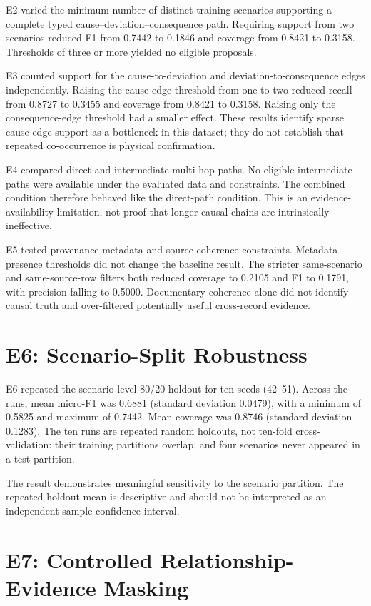 E2 varied the minimum number of distinct training scenarios supporting a
complete typed cause--deviation--consequence path. Requiring support from
two scenarios reduced F1 from 0.7442 to 0.1846 and coverage from 0.8421 to
0.3158. Thresholds of three or more yielded no eligible proposals.

E3 counted support for the cause-to-deviation and deviation-to-consequence
edges independently. Raising the cause-edge threshold from one to two
reduced recall from 0.8727 to 0.3455 and coverage from 0.8421 to 0.3158.
Raising only the consequence-edge threshold had a smaller effect. These
results identify sparse cause-edge support as a bottleneck in this dataset;
they do not establish that repeated co-occurrence is physical confirmation.

E4 compared direct and intermediate multi-hop paths. No eligible
intermediate paths were available under the evaluated data and constraints.
The combined condition therefore behaved like the direct-path condition.
This is an evidence-availability limitation, not proof that longer causal
chains are intrinsically ineffective.

E5 tested provenance metadata and source-coherence constraints. Metadata
presence thresholds did not change the baseline result. The stricter
same-scenario and same-source-row filters both reduced coverage to 0.2105
and F1 to 0.1791, with precision falling to 0.5000. Documentary coherence
alone did not identify causal truth and over-filtered potentially useful
cross-record evidence.

\section{E6: Scenario-Split Robustness}

E6 repeated the scenario-level 80/20 holdout for ten seeds (42--51). Across
the runs, mean micro-F1 was 0.6881 (standard deviation 0.0479), with a
minimum of 0.5825 and maximum of 0.7442. Mean coverage was 0.8746
(standard deviation 0.1283). The ten runs are repeated random holdouts,
not ten-fold cross-validation: their training partitions overlap, and four
scenarios never appeared in a test partition.

The result demonstrates meaningful sensitivity to the scenario partition.
The repeated-holdout mean is descriptive and should not be interpreted as
an independent-sample confidence interval.

\section{E7: Controlled Relationship-Evidence Masking}

